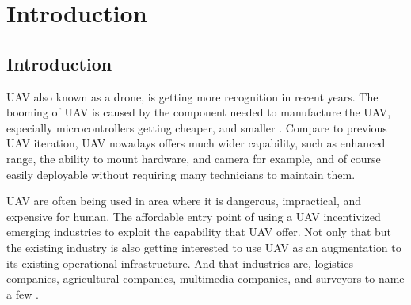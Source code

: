 \documentclass[12pt]{report}
\begin{document}

\chapter{Introduction}
    \section{Introduction}
        \ac{UAV} also known as a drone, is getting more recognition in recent years. The booming of UAV is caused by the
	    component needed to manufacture the UAV, especially microcontrollers getting cheaper, and smaller
	    \cite{austin_4_2024}. Compare to previous UAV iteration, UAV nowadays offers much wider capability, such as
	    enhanced range, the ability to mount hardware, and camera for example, and of course easily deployable without
	    requiring many technicians to maintain them.

		    UAV are often being used in area where it is dangerous, impractical, and expensive for human. The affordable
	    entry point of using a UAV incentivized emerging industries to exploit the capability that UAV offer. Not only
	    that but the existing industry is also getting interested to use UAV as an augmentation to its existing
	    operational infrastructure. And that industries are, logistics companies, agricultural companies, multimedia
	    companies, and surveyors to name a few \cite{dji_dji_2023}.
\end{document}
